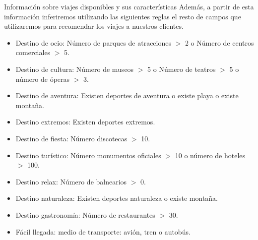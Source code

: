 \documentclass[11pt, a4paper, spanish, openright, twoside]{book}
\begin{document}
\begin{section}{Información sobre viajes disponibles y sus características}
			\newpage
			Además, a partir de esta información inferiremos utilizando las siguientes reglas el resto de campos que utilizaremos para
			recomendar los viajes a nuestros clientes.
			
				\begin{itemize}
					\item Destino de ocio: Número de parques de atracciones $>$ 2 o Número de centros comerciales $>$ 5.
					\item Destino de cultura: Número de museos $>$ 5 o Número de teatros $>$ 5 o número de óperas $>$ 3.
					\item Destino de aventura: Existen deportes de aventura o existe playa o existe montaña.
					\item Destino extremos: Existen deportes extremos.
					\item Destino de fiesta: Número discotecas $>$ 10.
					\item Destino turístico: Número monumentos oficiales $>$ 10 o número de hoteles $>$ 100.
					\item Destino relax: Número de balnearios $>$ 0.
					\item Destino naturaleza: Existen deportes naturaleza o existe montaña.
					\item Destino gastronomía: Número de restaurantes $>$ 30.
					\item Fácil llegada: medio de transporte: avión, tren o autobús.
					
					
				\end{itemize}
		
	\end{section}
	
\end{document}
